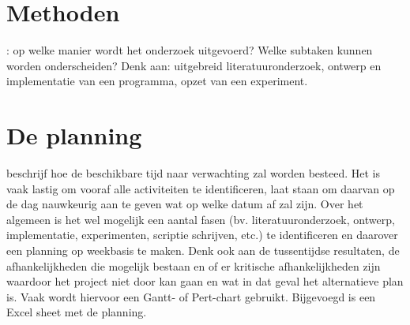 \documentclass{uva-inf-article}
\begin{document}
\section{Methoden}: op welke manier wordt het onderzoek uitgevoerd? Welke subtaken kunnen
worden onderscheiden? Denk aan: uitgebreid literatuuronderzoek, ontwerp en
implementatie van een programma, opzet van een experiment.
\section{De planning} beschrijf hoe de beschikbare tijd naar verwachting zal worden besteed.
Het is vaak lastig om vooraf alle activiteiten te identificeren, laat staan om daarvan op de
dag nauwkeurig aan te geven wat op welke datum af zal zijn. Over het algemeen is het
wel mogelijk een aantal fasen (bv. literatuuronderzoek, ontwerp, implementatie,
experimenten, scriptie schrijven, etc.) te identificeren en daarover een planning op
weekbasis te maken. Denk ook aan de tussentijdse resultaten, de afhankelijkheden die
mogelijk bestaan en of er kritische afhankelijkheden zijn waardoor het project niet door
kan gaan en wat in dat geval het alternatieve plan is. Vaak wordt hiervoor een Gantt- of
Pert-chart gebruikt.
Bijgevoegd is een Excel sheet met de planning.




\printbibliography

\end{document}
